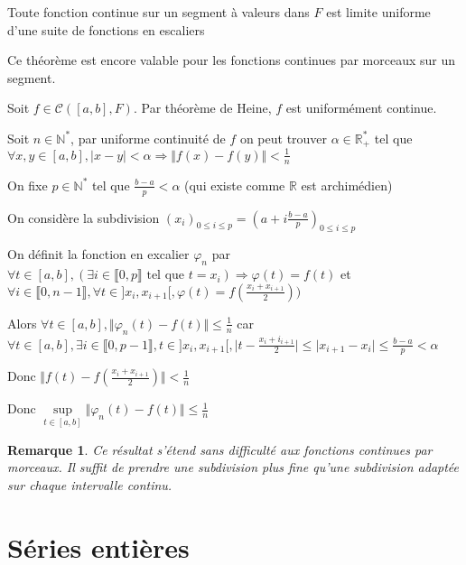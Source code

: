 \documentclass[a4paper,12pt]{book}
\newcommand{\Thr}[2]{\begin{tcolorbox}[sharp corners, colback=white,colframe=red!90!black!75, title=Théorème : #1]#2\end{tcolorbox}}
\newcommand{\Pre}[1]{\begin{tcolorbox}[sharp corners, colback=white,colframe=green!60!green!30!black!75, title=Preuve]#1\end{tcolorbox}}
\newtheorem{Rem}{Remarque}[section]
\def\R{\mathbb{R}}
\def\N{\mathbb{N}}
\begin{document}
\Thr{Approximmation uniforme par des fonctions en escalier}{Toute fonction continue sur un segment à valeurs dans $F$ est limite uniforme d'une suite de fonctions en escaliers \par Ce théorème est encore valable pour les fonctions continues par morceaux sur un segment.}
\Pre{Soit $f\in\mathcal{C}([a,b],F)$. Par théorème de Heine, $f$ est uniformément continue. \par Soit $n\in\N^*$, par uniforme continuité de $f$ on peut trouver $\alpha\in\R_+^*$ tel que $\forall x,y\in[a,b], \vert x-y\vert<\alpha\Rightarrow \Vert f(x)-f(y)\Vert < \frac{1}{n}$
\par On fixe $p\in\N^*$ tel que $\frac{b-a}{p}<\alpha$ (qui existe comme $\R$ est archimédien) \par On considère la subdivision $(x_i)_{0\leq i\leq p} = \left(a+i\frac{b-a}{p}\right)_{0\leq i\leq p}$ \par On définit la fonction en excalier $\varphi_n$ par $\forall t\in [a,b], (\exists i\in\llbracket 0,p\rrbracket \text{ tel que } t=x_i) \Rightarrow \varphi(t)=f(t)$ et $\forall i\in\llbracket 0,n-1\rrbracket,\forall t\in]x_i,x_{i+1}[, \varphi(t) = f\left(\frac{x_{i}+x_{i+1}}{2}\right))$
\par Alors $\forall t\in[a,b], \Vert \varphi_n(t)-f(t)\Vert\leq \frac{1}{n}$ car $\forall t\in[a,b],\exists i\in\llbracket 0,p-1\rrbracket, t\in ]x_{i}, x_{i+1}[, \vert t-\frac{x_i+i_{i+1}}{2}\vert\leq \vert x_{i+1}-x_i\vert \leq \frac{b-a}{p}< \alpha$ \par Donc $\Vert f(t)-f\left(\frac{x_i+x_{i+1}}{2}\right)\Vert<\frac{1}{n}$
\par Donc $\sup\limits_{t\in [a,b]}\Vert\varphi_n(t)-f(t)\Vert\leq \frac{1}{n}$}
\begin{Rem}
Ce résultat s'étend sans difficulté aux fonctions continues par morceaux. Il suffit de prendre une subdivision plus fine qu'une subdivision adaptée sur chaque intervalle continu.
\end{Rem}


\chapter{Séries entières}
\end{document}
